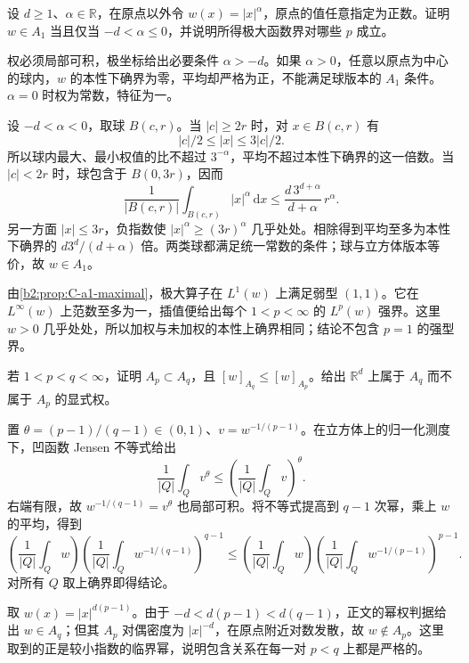 \begin{exercise}\label{b2:ex:app-C-5}
设 \(d\geq1\)、\(\alpha\in\mathbb R\)，在原点以外令 \(w(x)=|x|^\alpha\)，原点的值任意指定为正数。证明 \(w\in A_1\) 当且仅当 \(-d<\alpha\leq0\)，并说明所得极大函数界对哪些 \(p\) 成立。
\end{exercise}
\begin{solution}
权必须局部可积，极坐标给出必要条件 \(\alpha>-d\)。如果 \(\alpha>0\)，任意以原点为中心的球内，\(w\) 的本性下确界为零，平均却严格为正，不能满足球版本的 \(A_1\) 条件。\(\alpha=0\) 时权为常数，特征为一。

设 \(-d<\alpha<0\)，取球 \(B(c,r)\)。当 \(|c|\geq2r\) 时，对 \(x\in B(c,r)\) 有
\[
 |c|/2\leq |x|\leq3|c|/2.
\]
所以球内最大、最小权值的比不超过 \(3^{-\alpha}\)，平均不超过本性下确界的这一倍数。当 \(|c|<2r\) 时，球包含于 \(B(0,3r)\)，因而
\[
 \frac1{|B(c,r)|}\int_{B(c,r)}|x|^\alpha\,\mathrm dx
 \leq\frac{d\,3^{d+\alpha}}{d+\alpha}\,r^\alpha.
\]
另一方面 \(|x|\leq3r\)，负指数使 \(|x|^\alpha\geq(3r)^\alpha\) 几乎处处。相除得到平均至多为本性下确界的 \(d3^d/(d+\alpha)\) 倍。两类球都满足统一常数的条件；球与立方体版本等价，故 \(w\in A_1\)。

由\cref{b2:prop:C-a1-maximal}，极大算子在 \(L^1(w)\) 上满足弱型 \((1,1)\)。它在 \(L^\infty(w)\) 上范数至多为一，插值便给出每个 \(1<p<\infty\) 的 \(L^p(w)\) 强界。这里 \(w>0\) 几乎处处，所以加权与未加权的本性上确界相同；结论不包含 \(p=1\) 的强型界。
\end{solution}

\begin{exercise}\label{b2:ex:app-C-6}
若 \(1<p<q<\infty\)，证明 \(A_p\subset A_q\)，且 \([w]_{A_q}\leq[w]_{A_p}\)。给出 \(\mathbb R^d\) 上属于 \(A_q\) 而不属于 \(A_p\) 的显式权。
\end{exercise}
\begin{solution}
置 \(\theta=(p-1)/(q-1)\in(0,1)\)、\(v=w^{-1/(p-1)}\)。在立方体上的归一化测度下，凹函数 Jensen 不等式给出
\[
 \frac1{|Q|}\int_Qv^\theta
 \leq\left(\frac1{|Q|}\int_Qv\right)^\theta.
\]
右端有限，故 \(w^{-1/(q-1)}=v^\theta\) 也局部可积。将不等式提高到 \(q-1\) 次幂，乘上 \(w\) 的平均，得到
\[
 \left(\frac1{|Q|}\int_Qw\right)
 \left(\frac1{|Q|}\int_Qw^{-1/(q-1)}\right)^{q-1}
 \leq
 \left(\frac1{|Q|}\int_Qw\right)
 \left(\frac1{|Q|}\int_Qw^{-1/(p-1)}\right)^{p-1}.
\]
对所有 \(Q\) 取上确界即得结论。

取 \(w(x)=|x|^{d(p-1)}\)。由于 \(-d<d(p-1)<d(q-1)\)，正文的幂权判据给出 \(w\in A_q\)；但其 \(A_p\) 对偶密度为 \(|x|^{-d}\)，在原点附近对数发散，故 \(w\notin A_p\)。这里取到的正是较小指数的临界幂，说明包含关系在每一对 \(p<q\) 上都是严格的。
\end{solution}

